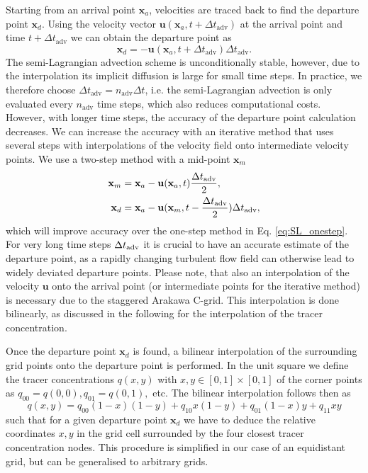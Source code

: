 Starting from an arrival point $\mathbf{x}_a$, velocities are traced back to find the
departure point $\mathbf{x}_d$. Using the velocity vector $\mathbf{u}(\mathbf{x}_a,t + \Delta t_{\mathrm{adv}})$ at the arrival point and time
$t + \Delta t_{\mathrm{adv}}$ we can obtain the departure point as
\begin{equation}
	\mathbf{x}_d = -\mathbf{u}(\mathbf{x}_a,t + \Delta t_{\mathrm{adv}})  \Delta t_{\mathrm{adv}}.
	\label{eq:SL_onestep}
\end{equation}
The semi-Lagrangian advection scheme is unconditionally stable, however, due to the interpolation its implicit diffusion is large for small time steps.
In practice, we therefore choose $\Delta t_{\mathrm{adv}} = n_\mathrm{adv} \Delta t$, i.e. the semi-Lagrangian advection is only evaluated every
$n_\mathrm{adv}$ time steps, which also reduces computational costs. However, with longer time steps, the accuracy of the departure point calculation
decreases. We can increase the accuracy with an iterative method that uses several steps with interpolations of the velocity field onto intermediate
velocity points. We use a two-step method with a mid-point $\mathbf{x}_m$
\begin{subequations}
	\begin{align}
	\mathbf{x}_m &= \mathbf{x}_a - \mathbf{u}(\mathbf{x}_a,t) \frac{\Delta t_{\operatorname{adv}}}{2}, \\
	\mathbf{x}_d &= \mathbf{x}_a - \mathbf{u}(\mathbf{x}_m,t-\frac{\Delta t_{\operatorname{adv}}}{2}) \Delta t_{\operatorname{adv}},
	\end{align}
	\label{eq:SL_iterative}
\end{subequations}
which will improve accuracy over the one-step method in Eq. \ref{eq:SL_onestep}. 
For very long time steps $\Delta t_{\operatorname{adv}}$ it is crucial to have an accurate estimate of the departure point, as a rapidly changing turbulent flow
field can otherwise lead to widely deviated departure points. Please note, that also an interpolation of the velocity $\mathbf{u}$ onto the arrival point
(or intermediate points for the iterative method) is necessary due to the staggered Arakawa C-grid. This interpolation is done bilinearly, as discussed
in the following for the interpolation of the tracer concentration.

Once the departure point $\mathbf{x}_d$ is found, a bilinear interpolation of the surrounding grid points onto the departure point is performed.
In the unit square we define the tracer concentrations $q(x,y)$ with $x,y \in [0,1]\times[0,1]$ of the corner points as
$q_{00} = q(0,0), q_{01} = q(0,1),$ etc. The bilinear interpolation follows then as
\begin{equation}
q(x,y) = q_{00}(1-x)(1-y) + q_{10}x(1-y) + q_{01}(1-x)y + q_{11}xy
\label{eq:bilin}
\end{equation}
such that for a given departure point $\mathbf{x}_d$ we have to deduce the relative coordinates $x,y$ in the grid cell surrounded by the four
closest tracer concentration nodes. This procedure is simplified in our case of an equidistant grid, but can be generalised to arbitrary grids. 

